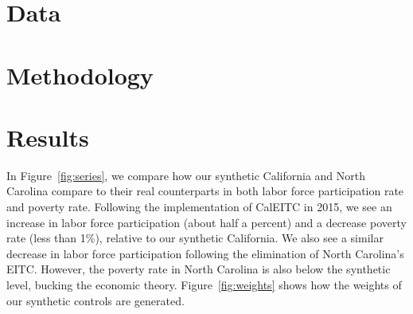 \documentclass{article}
\begin{document}
\section{Data}


\section{Methodology}


\section{Results}

In Figure~\ref{fig:series}, we compare how our synthetic California and North Carolina compare to their real counterparts in both labor force participation rate and poverty rate. Following the implementation of CalEITC in 2015, we see an increase in labor force participation (about half a percent) and a decrease poverty rate (less than 1\%), relative to our synthetic California. We also see a similar decrease in labor force participation following the elimination of North Carolina's EITC. However, the poverty rate in North Carolina is also below the synthetic level, bucking the economic theory. Figure~\ref{fig:weights} shows how the weights of our synthetic controls are generated. 

\end{document}
